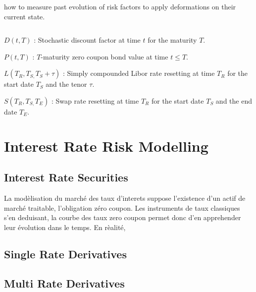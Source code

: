 \documentclass[3pt]{article}
\begin{document}
\bigskip

how to measure past evolution of risk factors to apply deformations on their
current state.

$\ \ \ \ \ $

\bigskip 

\bigskip 

\bigskip 

\bigskip 

$D(t,T)$ : Stochastic discount factor at time $t$ for the maturity $T$.

\bigskip

$P(t,T)$ : $T$-maturity zero coupon bond value at time $t\leq T$.

\bigskip

$L(T_{R},T_{S,}T_{S}+\tau )$ : Simply compounded Libor rate resetting at
time $T_{R}$ for the start date $T_{S}$ and the tenor $\tau $.

\bigskip

$S(T_{R},T_{S,}T_{E})$ : Swap rate resetting at time $T_{R}$ for the start
date $T_{S}$ and the end date $T_{E}$.

\bigskip

\section{Interest Rate Risk Modelling}

\subsection{Interest Rate Securities}

\bigskip La mod\`{e}lisation du march\'{e} des taux d'interets suppose
l'existence d'un actif de march\'{e} traitable, l'obligation z\'{e}ro
coupon. Les instruments de taux classiques s'en deduisant, la courbe des
taux zero coupon permet donc d'en apprehender leur \'{e}volution dans le
temps. En r\`{e}alit\'{e},

\bigskip

\subsection{Single Rate Derivatives}

\subsection{Multi Rate Derivatives}

\bigskip
\end{document}

